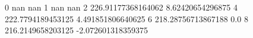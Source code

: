 0 nan nan
1 nan nan
2 226.91177368164062 8.62420654296875
4 222.7794189453125 4.491851806640625
6 218.28756713867188 0.0
8 216.2149658203125 -2.072601318359375
